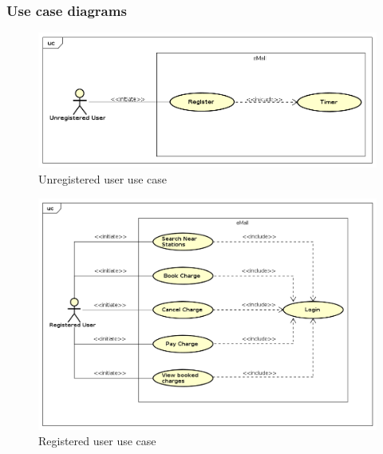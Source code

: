 \subsubsection{Use case diagrams}
\begin{figure}[!h]
    \includegraphics[keepaspectratio, width=16cm]{UseCase/UnregisteredUser.png}
    \caption{Unregistered user use case}
\end{figure}
\begin{figure}[!h]
    \includegraphics[keepaspectratio, width=16cm]{UseCase/RegisteredUser.png}
    \caption{Registered user use case}
\end{figure}
